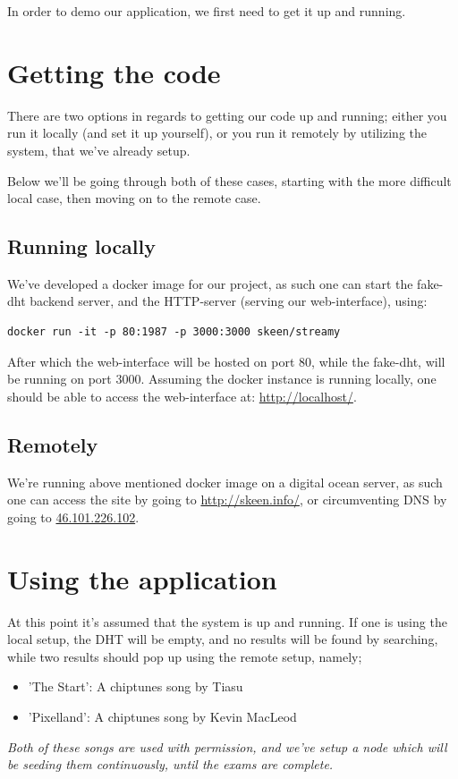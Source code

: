 In order to demo our application, we first need to get it up and running.

\section{Getting the code}
There are two options in regards to getting our code up and running; either you
run it locally (and set it up yourself), or you run it remotely by utilizing
the system, that we've already setup.

Below we'll be going through both of these cases, starting with the more 
difficult local case, then moving on to the remote case.

\subsection{Running locally}
We've developed a docker image for our project, as such one can start the 
fake-dht backend server, and the \acs{HTTP}-server (serving our web-interface), using:
\begin{verbatim}
docker run -it -p 80:1987 -p 3000:3000 skeen/streamy
\end{verbatim}
After which the web-interface will be hosted on port 80, while the fake-dht,
will be running on port 3000. Assuming the docker instance is running locally,
one should be able to access the web-interface at: \url{http://localhost/}.

\subsection{Remotely}
\label{subsec:running-remotely}
We're running above mentioned docker image on a digital ocean server, as such
one can access the site by going to \url{http://skeen.info/}, or circumventing
DNS by going to \url{46.101.226.102}.

\section{Using the application}
At this point it's assumed that the system is up and running. If one is using 
the local setup, the \acs{DHT} will be empty, and no results will be found by
searching, while two results should pop up using the remote setup, namely;
\begin{itemize}
\item 'The Start': A chiptunes song by Tiasu
\item 'Pixelland': A chiptunes song by Kevin MacLeod
\end{itemize}
{\em Both of these songs are used with permission, and we've setup a node which will
be seeding them continuously, until the exams are complete.}

